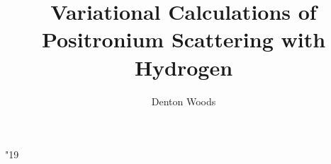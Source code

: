 
\newcommand{\todoi}{\todo[inline]}

\DeclareMathSymbol \uppi {} {"19}

%



\renewcommand{\showlabelfont}{\tiny}

\graphicspath{{IPython/}{Images/}}

\setlength{\extrarowheight}{3pt}


\title{Variational Calculations of Positronium Scattering with Hydrogen}
\author{Denton Woods}



\clearpage
{}
{} %
\maketitle
\newpage

